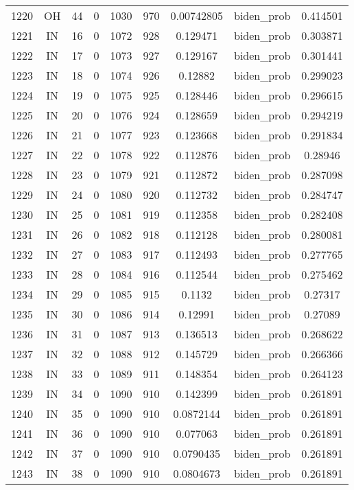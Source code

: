 \documentclass[12pt,a4paper]{article}
\begin{document}
\begin{tabular}{r|cccccccc}
	1220 & OH & 44 & 0 & 1030 & 970 & 0.00742805 & biden\_prob & 0.414501 \\
	1221 & IN & 16 & 0 & 1072 & 928 & 0.129471 & biden\_prob & 0.303871 \\
	1222 & IN & 17 & 0 & 1073 & 927 & 0.129167 & biden\_prob & 0.301441 \\
	1223 & IN & 18 & 0 & 1074 & 926 & 0.12882 & biden\_prob & 0.299023 \\
	1224 & IN & 19 & 0 & 1075 & 925 & 0.128446 & biden\_prob & 0.296615 \\
	1225 & IN & 20 & 0 & 1076 & 924 & 0.128659 & biden\_prob & 0.294219 \\
	1226 & IN & 21 & 0 & 1077 & 923 & 0.123668 & biden\_prob & 0.291834 \\
	1227 & IN & 22 & 0 & 1078 & 922 & 0.112876 & biden\_prob & 0.28946 \\
	1228 & IN & 23 & 0 & 1079 & 921 & 0.112872 & biden\_prob & 0.287098 \\
	1229 & IN & 24 & 0 & 1080 & 920 & 0.112732 & biden\_prob & 0.284747 \\
	1230 & IN & 25 & 0 & 1081 & 919 & 0.112358 & biden\_prob & 0.282408 \\
	1231 & IN & 26 & 0 & 1082 & 918 & 0.112128 & biden\_prob & 0.280081 \\
	1232 & IN & 27 & 0 & 1083 & 917 & 0.112493 & biden\_prob & 0.277765 \\
	1233 & IN & 28 & 0 & 1084 & 916 & 0.112544 & biden\_prob & 0.275462 \\
	1234 & IN & 29 & 0 & 1085 & 915 & 0.1132 & biden\_prob & 0.27317 \\
	1235 & IN & 30 & 0 & 1086 & 914 & 0.12991 & biden\_prob & 0.27089 \\
	1236 & IN & 31 & 0 & 1087 & 913 & 0.136513 & biden\_prob & 0.268622 \\
	1237 & IN & 32 & 0 & 1088 & 912 & 0.145729 & biden\_prob & 0.266366 \\
	1238 & IN & 33 & 0 & 1089 & 911 & 0.148354 & biden\_prob & 0.264123 \\
	1239 & IN & 34 & 0 & 1090 & 910 & 0.142399 & biden\_prob & 0.261891 \\
	1240 & IN & 35 & 0 & 1090 & 910 & 0.0872144 & biden\_prob & 0.261891 \\
	1241 & IN & 36 & 0 & 1090 & 910 & 0.077063 & biden\_prob & 0.261891 \\
	1242 & IN & 37 & 0 & 1090 & 910 & 0.0790435 & biden\_prob & 0.261891 \\
	1243 & IN & 38 & 0 & 1090 & 910 & 0.0804673 & biden\_prob & 0.261891 \\

\end{tabular}
\end{document}
